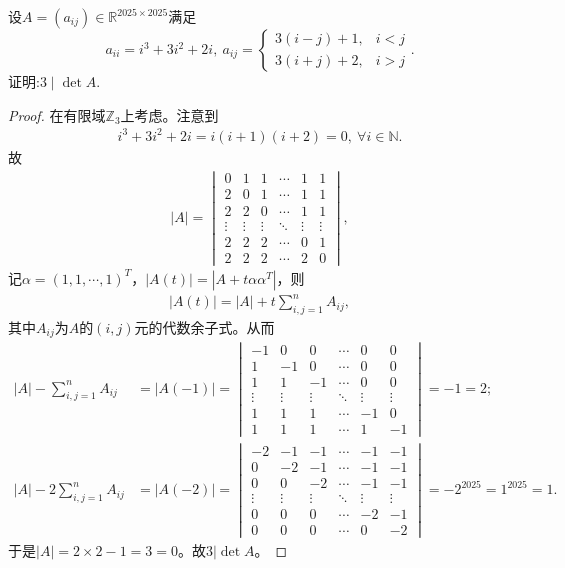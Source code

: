 \documentclass[../../main.tex]{subfiles}
\begin{document}
\begin{example}
设$A = (a_{ij}) \in \mathbb{R}^{2025 \times 2025}$满足
\[
a_{ii} = i^3 + 3i^2 + 2i, \ a_{ij} = \begin{cases}
3(i - j) + 1, & i < j \\
3(i + j) + 2, & i > j
\end{cases}.
\]
证明:$3 \mid \det A$.
\end{example}
\begin{proof}
在有限域$\mathbb{Z}_3$上考虑。注意到
\begin{align*}
i^3+3i^2+2i=i(i+1)(i+2)=0,\ \forall i\in\mathbb{N}.
\end{align*}
故
\begin{align*}
|A|=\begin{vmatrix}
0&1&1&\cdots&1&1\\
2&0&1&\cdots&1&1\\
2&2&0&\cdots&1&1\\
\vdots&\vdots&\vdots&\ddots&\vdots&\vdots\\
2&2&2&\cdots&0&1\\
2&2&2&\cdots&2&0
\end{vmatrix},
\end{align*}
记$\alpha=(1,1,\cdots,1)^T$，$|A(t)|=|A+t\alpha\alpha^T|$，则
\begin{align*}
|A(t)|=|A|+t\sum_{i,j=1}^n A_{ij},
\end{align*}
其中$A_{ij}$为$A$的$(i,j)$元的代数余子式。从而
\begin{align*}
|A|-\sum_{i,j=1}^n A_{ij}&=|A(-1)|=\begin{vmatrix}
-1&0&0&\cdots&0&0\\
1&-1&0&\cdots&0&0\\
1&1&-1&\cdots&0&0\\
\vdots&\vdots&\vdots&\ddots&\vdots&\vdots\\
1&1&1&\cdots&-1&0\\
1&1&1&\cdots&1&-1
\end{vmatrix}=-1=2;\\
|A|-2\sum_{i,j=1}^n A_{ij}&=|A(-2)|=\begin{vmatrix}
-2&-1&-1&\cdots&-1&-1\\
0&-2&-1&\cdots&-1&-1\\
0&0&-2&\cdots&-1&-1\\
\vdots&\vdots&\vdots&\ddots&\vdots&\vdots\\
0&0&0&\cdots&-2&-1\\
0&0&0&\cdots&0&-2
\end{vmatrix}=-2^{2025}=1^{2025}=1.
\end{align*}
于是$|A|=2\times 2-1=3=0$。故$3|\det A$。

\end{proof}
\end{document}
